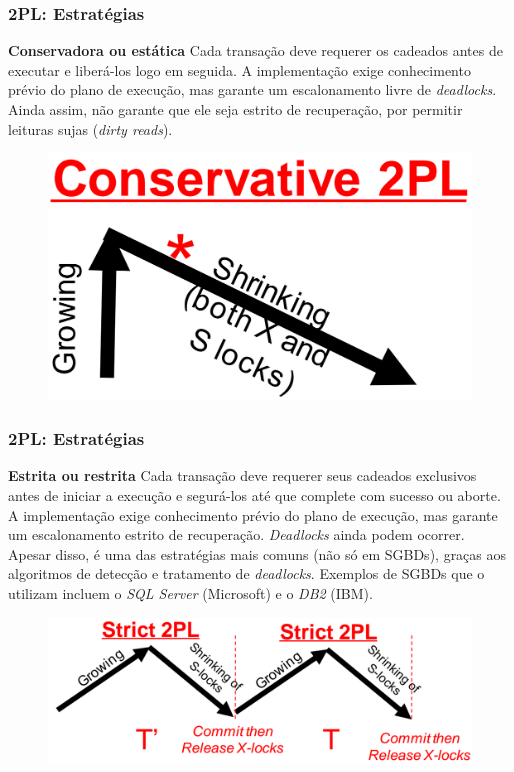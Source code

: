 \documentclass{beamer}
\begin{document}
\begin{frame}
    \frametitle{2PL: Estratégias}
    
    \begin{block}{\textbf{Conservadora ou estática}}
        Cada transação deve requerer os cadeados antes de executar e liberá-los logo em seguida. A implementação exige conhecimento prévio do plano de execução, mas garante um escalonamento livre de \emph{deadlocks}. Ainda assim, não garante que ele seja estrito de recuperação, por permitir leituras sujas (\emph{dirty reads}).

        \medskip
        \begin{figure}
            \includegraphics[width=0.8\linewidth]{conservative2pl.png}
        \end{figure}
    \end{block}
\end{frame}


\begin{frame}
    \frametitle{2PL: Estratégias}
    \begin{block}{\textbf{Estrita ou restrita}}
        Cada transação deve requerer seus cadeados exclusivos antes de iniciar a execução e segurá-los até que complete com sucesso ou aborte. A implementação exige conhecimento prévio do plano de execução, mas garante um escalonamento estrito de recuperação. \emph{Deadlocks} ainda podem ocorrer. Apesar disso, é uma das estratégias mais comuns (não só em SGBDs), graças aos algoritmos de detecção e tratamento de \emph{deadlocks}. Exemplos de SGBDs que o utilizam incluem o \emph{SQL Server} (Microsoft) e o \emph{DB2} (IBM).

        \medskip
        \begin{figure}
            \includegraphics[width=0.8\linewidth]{strict2pl.png}
        \end{figure}
    \end{block}
\end{frame}
\end{document}
